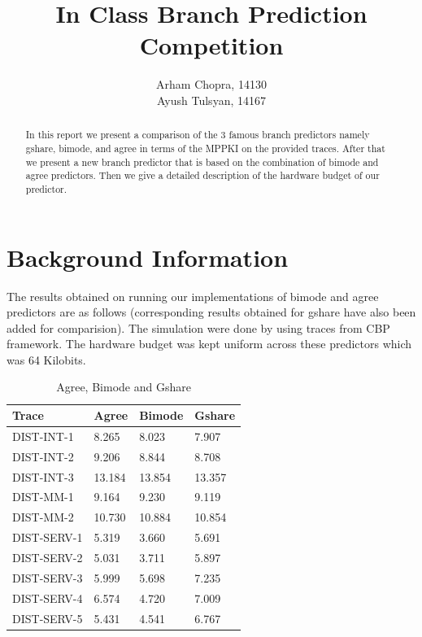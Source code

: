 \documentclass{sig-alternate}
\title{In Class Branch Prediction Competition}
\author{Arham Chopra, 14130 \\ Ayush Tulsyan, 14167}
\begin{document}
\maketitle
\thispagestyle{firstpage}
\pagestyle{plain}

\begin{abstract}

In this report we present a comparison of the 3 famous branch predictors namely gshare, bimode, and agree in terms of the MPPKI on the provided traces. After that we present a new branch predictor that is based on the combination of bimode and agree predictors. Then we give a detailed description of the hardware budget of our predictor.

\end{abstract}

\section{Background Information}

The results obtained on running our implementations of bimode and agree predictors are as follows (corresponding results obtained for gshare have also been added for comparision). The simulation were done by using traces from CBP framework. The hardware budget was kept uniform across these predictors which was 64 Kilobits.

\begin{table}[h]

\caption{Agree\cite{agreepaper}, Bimode\cite{bimodepaper} and Gshare\cite{gsharepaper}}
\centering

\begin{tabular}{llll}

\hline
Trace & Agree & Bimode & Gshare \\
\hline
DIST-INT-1 & 8.265 & 8.023 & 7.907 \\
DIST-INT-2 & 9.206 & 8.844 & 8.708 \\
DIST-INT-3 & 13.184 & 13.854 & 13.357 \\
DIST-MM-1 & 9.164 & 9.230 & 9.119 \\
DIST-MM-2 & 10.730 & 10.884 & 10.854 \\
DIST-SERV-1 & 5.319 & 3.660 & 5.691 \\
DIST-SERV-2 & 5.031 & 3.711 & 5.897 \\
DIST-SERV-3 & 5.999 & 5.698 & 7.235 \\
DIST-SERV-4 & 6.574 & 4.720 & 7.009 \\
DIST-SERV-5 & 5.431 & 4.541 & 6.767 \\
\hline

\end{tabular}

\end{table}
\end{document}
